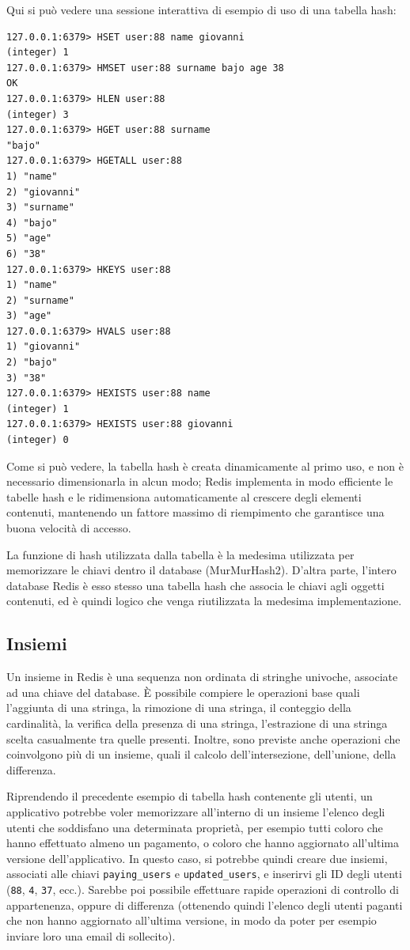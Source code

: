Qui si può vedere una sessione interattiva di esempio di uso di una tabella hash:

\medskip
\begin{lstlisting}
127.0.0.1:6379> HSET user:88 name giovanni
(integer) 1
127.0.0.1:6379> HMSET user:88 surname bajo age 38
OK
127.0.0.1:6379> HLEN user:88
(integer) 3
127.0.0.1:6379> HGET user:88 surname
"bajo"
127.0.0.1:6379> HGETALL user:88
1) "name"
2) "giovanni"
3) "surname"
4) "bajo"
5) "age"
6) "38"
127.0.0.1:6379> HKEYS user:88
1) "name"
2) "surname"
3) "age"
127.0.0.1:6379> HVALS user:88
1) "giovanni"
2) "bajo"
3) "38"
127.0.0.1:6379> HEXISTS user:88 name
(integer) 1
127.0.0.1:6379> HEXISTS user:88 giovanni
(integer) 0
\end{lstlisting}

Come si può vedere, la tabella hash è creata dinamicamente al primo uso, e non è necessario
dimensionarla in alcun modo; Redis implementa in modo efficiente le tabelle hash e le ridimensiona
automaticamente al crescere degli elementi contenuti, mantenendo un fattore massimo di riempimento
che garantisce una buona velocità di accesso.

La funzione di hash utilizzata dalla tabella è la medesima utilizzata per memorizzare le chiavi
dentro il database (MurMurHash2). D'altra parte, l'intero database Redis è esso stesso una tabella
hash che associa le chiavi agli oggetti contenuti, ed è quindi logico che venga riutilizzata la
medesima implementazione.

\subsection{Insiemi}

Un insieme in Redis è una sequenza non ordinata di stringhe univoche, associate ad una chiave del
database. È possibile compiere le operazioni base quali l'aggiunta di una stringa, la rimozione di
una stringa, il conteggio della cardinalità, la verifica della presenza di una stringa, l'estrazione
di una stringa scelta casualmente tra quelle presenti. Inoltre, sono previste anche operazioni che
coinvolgono più di un insieme, quali il calcolo dell'intersezione, dell'unione, della differenza.

Riprendendo il precedente esempio di tabella hash contenente gli utenti, un applicativo potrebbe
voler memorizzare all'interno di un insieme l'elenco degli utenti che soddisfano una determinata
proprietà, per esempio tutti coloro che hanno effettuato almeno un pagamento, o coloro che hanno
aggiornato all'ultima versione dell'applicativo. In questo caso, si potrebbe quindi creare due
insiemi, associati alle chiavi \verb|paying_users| e \verb|updated_users|, e inserirvi gli ID degli
utenti (\verb|88|, \verb|4|, \verb|37|, ecc.). Sarebbe poi possibile effettuare rapide operazioni di
controllo di appartenenza, oppure di differenza (ottenendo quindi l'elenco degli utenti paganti che
non hanno aggiornato all'ultima versione, in modo da poter per esempio inviare loro una email di
sollecito).

